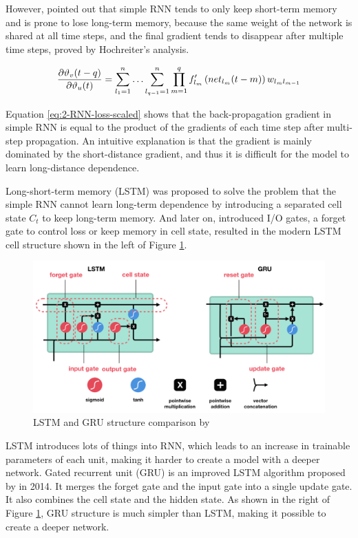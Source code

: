 However, \citet{hochreiter1997long} pointed out that simple RNN tends to only keep short-term memory and is prone to lose long-term memory, because the same weight of the network is shared at all time steps, and the final gradient tends to disappear after multiple time steps, proved by Hochreiter's analysis.

\begin{equation}
    \frac{\partial \vartheta_{v}(t-q)}{\partial \vartheta_{u}(t)}=\sum_{l_{1}=1}^{n} \ldots \sum_{l_{q-1}=1}^{n} \prod_{m=1}^{q} f_{l_{m}}^{\prime}\left(n e t_{l_{m}}(t-m)\right) w_{l_{m} l_{m-1}}
    \eqcite{hochreiter1997long}
    \label{eq:2-RNN-loss-scaled}
\end{equation}

Equation \ref{eq:2-RNN-loss-scaled} shows that the back-propagation gradient in simple RNN is equal to the product of the gradients of each time step after multi-step propagation.
An intuitive explanation is that the gradient is mainly dominated by the short-distance gradient, and thus it is difficult for the model to learn long-distance dependence.

Long-short-term memory (LSTM) was proposed to solve the problem that the simple RNN cannot learn long-term dependence by introducing a separated cell state $C_t$ to keep long-term memory. And later on, \citet{Gers2000LearningTF} introduced I/O gates, a forget gate to control loss or keep memory in cell state, resulted in the modern LSTM cell structure shown in the left of Figure \ref{fig:ext-LSTM-GRU}.

\begin{figure}[ht!]
    \centering
    \includegraphics[width=.9\textwidth]{literature/imgs/ext-LSTM-GRU.png}
    \caption{LSTM and GRU structure comparison by \citet{phi2018illustrated}}
    \label{fig:ext-LSTM-GRU}
\end{figure}

LSTM introduces lots of things into RNN, which leads to an increase in trainable parameters of each unit, making it harder to create a model with a deeper network.
Gated recurrent unit (GRU) is an improved LSTM algorithm proposed by \citet{chung2014empirical} in 2014. It merges the forget gate and the input gate into a single update gate. It also combines the cell state and the hidden state.
As shown in the right of Figure \ref{fig:ext-LSTM-GRU}, GRU structure is much simpler than LSTM, making it possible to create a deeper network.

